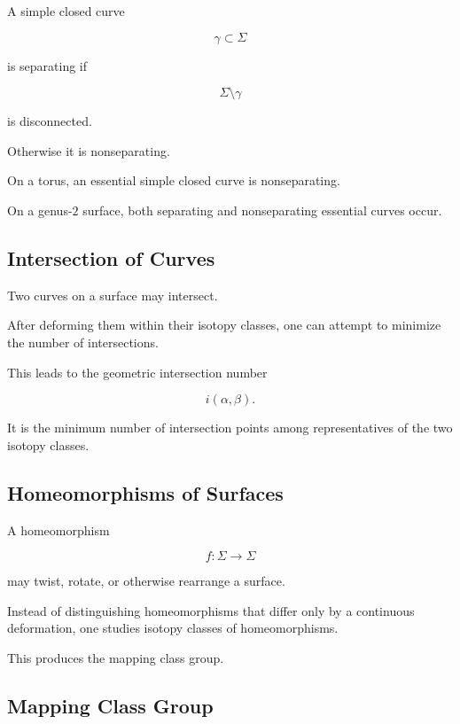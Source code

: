 A simple closed curve

\[
\gamma\subset\Sigma
\]

is separating if

\[
\boxed{
\Sigma\setminus\gamma
}
\]

is disconnected.

Otherwise it is nonseparating.

On a torus, an essential simple closed curve is nonseparating.

On a genus-\(2\) surface, both separating and nonseparating essential curves
occur.

\subsection{Intersection of Curves}
\label{subsec:intersection-curves-surfaces}

Two curves on a surface may intersect.

After deforming them within their isotopy classes, one can attempt to
minimize the number of intersections.

This leads to the geometric intersection number

\[
\boxed{
i(\alpha,\beta).
}
\]

It is the minimum number of intersection points among representatives of the
two isotopy classes.

\subsection{Homeomorphisms of Surfaces}
\label{subsec:homeomorphisms-surfaces}

A homeomorphism

\[
f:\Sigma\to\Sigma
\]

may twist, rotate, or otherwise rearrange a surface.

Instead of distinguishing homeomorphisms that differ only by a continuous
deformation, one studies isotopy classes of homeomorphisms.

This produces the mapping class group.

\subsection{Mapping Class Group}
\label{subsec:mapping-class-group}

